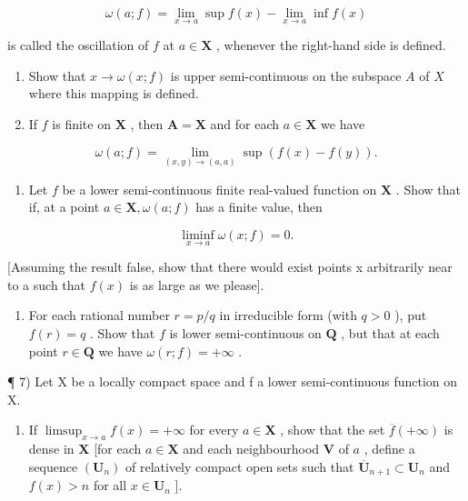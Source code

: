 \[
\omega (a; f) = \lim _ {x \to a} \sup f (x) - \lim _ {x \to a} \inf f (x)
\]

is called the oscillation of \(f\) at \(a \in \mathbf{X}\) , whenever the right-hand side is defined.

\begin{enumerate}
\def\labelenumi{\alph{enumi})}
\item
  Show that \(x \to \omega(x; f)\) is upper semi-continuous on the subspace \(A\) of \(X\) where this mapping is defined.
\item
  If \(f\) is finite on \(\mathbf{X}\) , then \(\mathbf{A} = \mathbf{X}\) and for each \(a \in \mathbf{X}\) we have
\end{enumerate}

\[
\omega (a; f) = \lim _ {(x, y) \rightarrow (a, a)} \sup (f (x) - f (y)).
\]

\begin{enumerate}
\def\labelenumi{\alph{enumi})}
\setcounter{enumi}{2}
\tightlist
\item
  Let \(f\) be a lower semi-continuous finite real-valued function on \(\mathbf{X}\) . Show that if, at a point \(a \in \mathbf{X}, \omega(a; f)\) has a finite value, then
\end{enumerate}

\[
\liminf _ {x \to a} \omega (x; f) = 0.
\]

{[}Assuming the result false, show that there would exist points x arbitrarily near to a such that \(f(x)\) is as large as we please{]}.

\begin{enumerate}
\def\labelenumi{\alph{enumi})}
\setcounter{enumi}{3}
\tightlist
\item
  For each rational number \(r = p / q\) in irreducible form (with \(q > 0\) ), put \(f(r) = q\) . Show that \(f\) is lower semi-continuous on \(\mathbf{Q}\) , but that at each point \(r \in \mathbf{Q}\) we have \(\omega(r; f) = +\infty\) .
\end{enumerate}

¶ 7) Let X be a locally compact space and f a lower semi-continuous function on X.

\begin{enumerate}
\def\labelenumi{\alph{enumi})}
\tightlist
\item
  If \(\limsup_{x\to a}f(x)=+\infty\) for every \(a\in\mathbf{X}\) , show that the set \(\overline{f}(+\infty)\) is dense in \(\mathbf{X}\) {[}for each \(a\in\mathbf{X}\) and each neighbourhood \(\mathbf{V}\) of \(a\) , define a sequence \((\mathbf{U}_{n})\) of relatively compact open sets such that \(\overline{\mathbf{U}}_{n+1}\subset\mathbf{U}_{n}\) and \(f(x)>n\) for all \(x\in\mathbf{U}_{n}\) {]}.
\end{enumerate}

